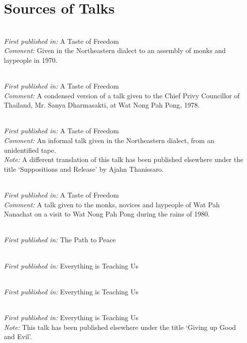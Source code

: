 
\chapter{Sources of Talks}

{\setlength{\parindent}{0pt}\setlength{\parskip}{1.2em}

\vspace*{-\baselineskip}
 \\
\textit{First published in:} A Taste of Freedom \\
\textit{Comment:} Given in the Northeastern dialect to an assembly of monks and laypeople in 1970.

 \\
\textit{First published in:} A Taste of Freedom \\
\textit{Comment:} A condensed version of a talk given to the Chief Privy Councillor of Thailand, Mr. Sanya Dharmasakti, at Wat Nong Pah Pong, 1978.

 \\
\textit{First published in:} A Taste of Freedom \\
\textit{Comment:} An informal talk given in the Northeastern dialect, from an unidentified tape. \\
\textit{Note:} A different translation of this talk has been published elsewhere under the title `Suppositions and Release' by Ajahn Thanissaro.

 \\
\textit{First published in:} A Taste of Freedom \\
\textit{Comment:} A talk given to the monks, novices and laypeople of Wat Pah Nanachat on a visit to Wat Nong Pah Pong during the rains of 1980.

 \\
\textit{First published in:} The Path to Peace

 \\
\textit{First published in:} Everything is Teaching Us

 \\
\textit{First published in:} Everything is Teaching Us

 \\
\textit{First published in:} Everything is Teaching Us \\
\textit{Note:} This talk has been published elsewhere under the title `Giving up Good and Evil'.

}
